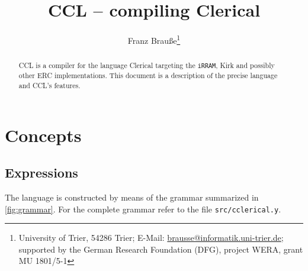 \documentclass[a4paper,11pt,parskip=half]{scrartcl}
\title{CCL -- compiling Clerical}
\author{Franz Brauße\footnote{%
	University of Trier, 54286 Trier;
	E-Mail: \href{mailto:brausse@informatik.uni-trier.de}%
	                   {brausse@informatik.uni-trier.de};
	supported by the German Research Foundation (DFG),
	project WERA, grant MU 1801/5-1}}
\newcommand*\iRRAM{\texttt{iRRAM}}
\begin{document}
\maketitle
\begin{abstract}
CCL is a compiler for the language Clerical targeting the \iRRAM, Kirk and
possibly other ERC implementations. This document is a description of the
precise language and CCL's features.
\end{abstract}

\section{Concepts}
\subsection{Expressions}
The language is constructed by means of the grammar summarized in
\cref{fig:grammar}. For the complete grammar refer to the file
\texttt{src/cclerical.y}.
\end{document}
